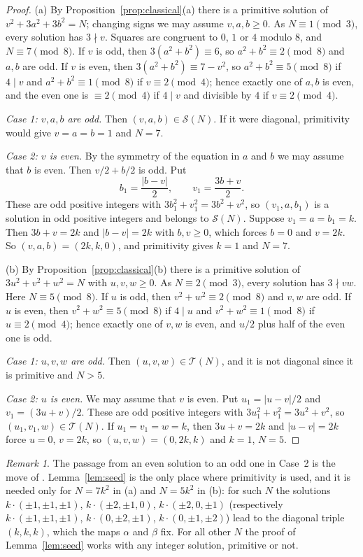 \documentclass[11pt]{amsart}
\theoremstyle{definition}
\theoremstyle{remark}
\newtheorem{remark}[theorem]{Remark}
\newcommand{\cS}{\mathcal{S}}
\newcommand{\cT}{\mathcal{T}}
\begin{document}
\begin{proof}
(a) By Proposition~\ref{prop:classical}(a) there is a primitive solution of $v^2+3a^2+3b^2=N$; changing signs we may assume $v,a,b\ge 0$.
As $N\equiv 1\pmod 3$, every solution has $3\nmid v$.
Squares are congruent to $0$, $1$ or $4$ modulo $8$, and $N\equiv 7\pmod 8$.
If $v$ is odd, then $3(a^2+b^2)\equiv 6$, so $a^2+b^2\equiv 2\pmod 8$ and $a,b$ are odd.
If $v$ is even, then $3(a^2+b^2)\equiv 7-v^2$, so $a^2+b^2\equiv 5\pmod 8$ if $4\mid v$ and $a^2+b^2\equiv 1\pmod 8$ if $v\equiv 2\pmod 4$;
hence exactly one of $a,b$ is even, and the even one is $\equiv 2\pmod 4$ if $4\mid v$ and divisible by $4$ if $v\equiv 2\pmod 4$.

\emph{Case 1: $v,a,b$ are odd.} Then $(v,a,b)\in\cS(N)$. If it were diagonal, primitivity would give $v=a=b=1$ and $N=7$.

\emph{Case 2: $v$ is even.} By the symmetry of the equation in $a$ and $b$ we may assume that $b$ is even. Then $v/2+b/2$ is odd. Put
\[
b_1=\frac{|b-v|}{2},\qquad v_1=\frac{3b+v}{2}.
\]
These are odd positive integers with $3b_1^2+v_1^2=3b^2+v^2$, so $(v_1,a,b_1)$ is a solution in odd positive integers and belongs to $\cS(N)$.
Suppose $v_1=a=b_1=k$. Then $3b+v=2k$ and $|b-v|=2k$ with $b,v\ge 0$, which forces $b=0$ and $v=2k$.
So $(v,a,b)=(2k,k,0)$, and primitivity gives $k=1$ and $N=7$.

(b) By Proposition~\ref{prop:classical}(b) there is a primitive solution of $3u^2+v^2+w^2=N$ with $u,v,w\ge 0$.
As $N\equiv 2\pmod 3$, every solution has $3\nmid vw$. Here $N\equiv 5\pmod 8$.
If $u$ is odd, then $v^2+w^2\equiv 2\pmod 8$ and $v,w$ are odd.
If $u$ is even, then $v^2+w^2\equiv 5\pmod 8$ if $4\mid u$ and $v^2+w^2\equiv 1\pmod 8$ if $u\equiv 2\pmod 4$;
hence exactly one of $v,w$ is even, and $u/2$ plus half of the even one is odd.

\emph{Case 1: $u,v,w$ are odd.} Then $(u,v,w)\in\cT(N)$, and it is not diagonal since it is primitive and $N>5$.

\emph{Case 2: $u$ is even.} We may assume that $v$ is even. Put $u_1=|u-v|/2$ and $v_1=(3u+v)/2$.
These are odd positive integers with $3u_1^2+v_1^2=3u^2+v^2$, so $(u_1,v_1,w)\in\cT(N)$.
If $u_1=v_1=w=k$, then $3u+v=2k$ and $|u-v|=2k$ force $u=0$, $v=2k$, so $(u,v,w)=(0,2k,k)$ and $k=1$, $N=5$.
\end{proof}

\begin{remark}
The passage from an even solution to an odd one in Case~2 is the move of \cite[Lemma~3.2]{S15}.
Lemma~\ref{lem:seed} is the only place where primitivity is used, and it is needed only for $N=7k^2$ in (a) and $N=5k^2$ in (b):
for such $N$ the solutions $k\cdot(\pm1,\pm1,\pm1)$, $k\cdot(\pm2,\pm1,0)$, $k\cdot(\pm 2,0,\pm 1)$
(respectively $k\cdot(\pm1,\pm1,\pm1)$, $k\cdot(0,\pm2,\pm1)$, $k\cdot(0,\pm 1,\pm 2)$) lead to the diagonal triple $(k,k,k)$, which the maps $\alpha$ and $\beta$ fix.
For all other $N$ the proof of Lemma~\ref{lem:seed} works with any integer solution, primitive or not.
\end{remark}
\end{document}
